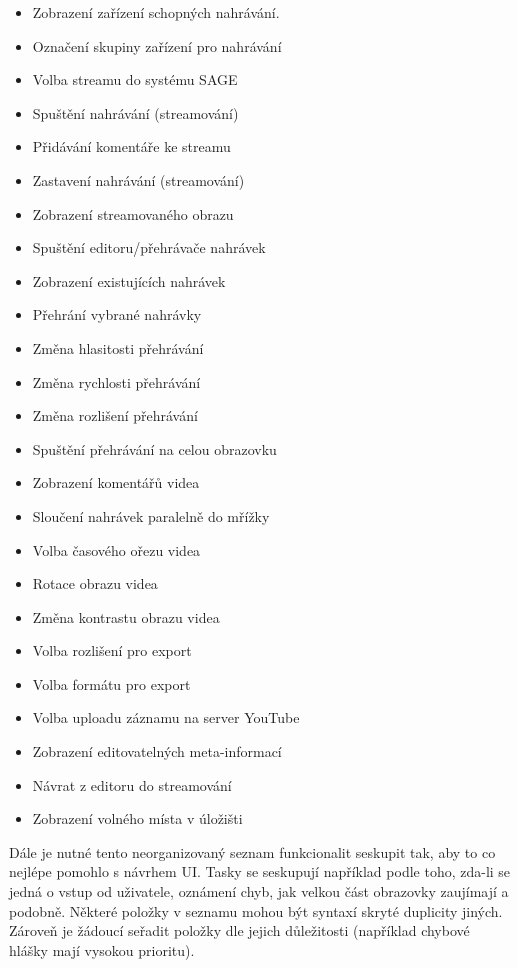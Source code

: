 \documentclass[thesis=M,czech]{FITthesis}[2012/06/26]
\begin{document}
\begin{itemize}
 \item Zobrazení zařízení schopných nahrávání.
 \item Označení skupiny zařízení pro nahrávání
 \item Volba streamu do systému SAGE
 \item Spuštění nahrávání (streamování)
 \item Přidávání komentáře ke streamu
 \item Zastavení nahrávání (streamování)
 \item Zobrazení streamovaného obrazu
 \item Spuštění editoru/přehrávače nahrávek
 \item Zobrazení existujících nahrávek
 \item Přehrání vybrané nahrávky
 \item Změna hlasitosti přehrávání
 \item Změna rychlosti přehrávání
 \item Změna rozlišení přehrávání
 \item Spuštění přehrávání na celou obrazovku
 \item Zobrazení komentářů videa
 \item Sloučení nahrávek paralelně do mřížky
 \item Volba časového ořezu videa 
 \item Rotace obrazu videa
 \item Změna kontrastu obrazu videa
 \item Volba rozlišení pro export
 \item Volba formátu pro export
 \item Volba uploadu záznamu na server YouTube
 \item Zobrazení editovatelných meta-informací
 \item Návrat z editoru do streamování
 \item Zobrazení volného místa v úložišti
\end{itemize}

Dále je nutné tento neorganizovaný seznam funkcionalit seskupit tak, aby to co nejlépe pomohlo s návrhem UI. Tasky se seskupují například podle toho, zda-li se jedná o vstup od uživatele, oznámení chyb, jak velkou část obrazovky zaujímají a podobně. Některé položky v seznamu mohou být syntaxí skryté duplicity jiných. Zároveň je žádoucí seřadit položky dle jejich důležitosti (například chybové hlášky mají vysokou prioritu).
\end{document}
